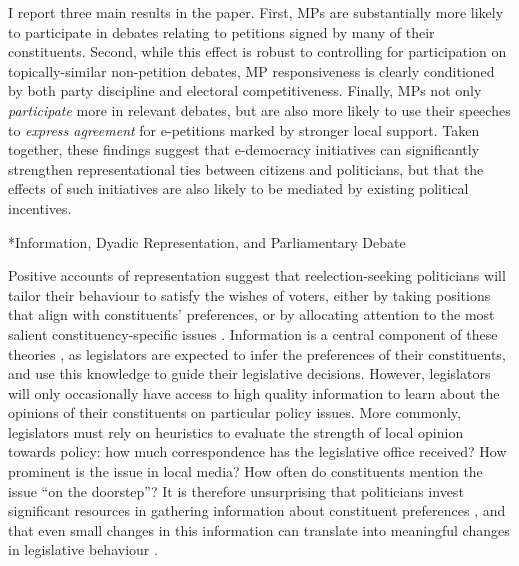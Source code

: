 \documentclass[12pt]{article}
\makeatletter
\renewcommand{\section}{\@startsection{section}{1}{0mm}{-\baselineskip}{0.20\baselineskip}{\centering\normalfont\normalsize\scshape}}
\makeatother
\begin{document}
I report three main results in the paper. First, MPs are substantially more likely to participate in debates relating to petitions signed by many of their constituents. Second, while this effect is robust to controlling for participation on topically-similar non-petition debates, MP responsiveness is clearly conditioned by both party discipline and electoral competitiveness. Finally, MPs not only \emph{participate} more in relevant debates, but are also more likely to use their speeches to \emph{express agreement} for e-petitions marked by stronger local support. Taken together, these findings suggest that e-democracy initiatives can significantly strengthen representational ties between citizens and politicians, but that the effects of such initiatives are also likely to be mediated by existing political incentives.


\section*{Information, Dyadic Representation, and Parliamentary Debate}

Positive accounts of representation suggest that reelection-seeking politicians will tailor their behaviour to satisfy the wishes of voters, either by taking positions that align with constituents' preferences, or by allocating attention to the most salient constituency-specific issues \citep{downs1957economic, mayhew1974congress, cain1984constituency, hall1996participation}.  Information is a central component of these theories \citep[516--520]{mansbridge2003rethinking}, as legislators are expected to infer the preferences of their constituents, and use this knowledge to guide their legislative decisions. However, legislators will only occasionally have access to high quality information to learn about the opinions of their constituents on particular policy issues. More commonly, legislators must rely on heuristics to evaluate the strength of local opinion towards policy: how much correspondence has the legislative office received? How prominent is the issue in local media? How often do constituents mention the issue ``on the doorstep''? It is therefore unsurprising that politicians invest significant resources in gathering information about constituent preferences \citep{maestas2003incentive}, and that even small changes in this information can translate into meaningful changes in legislative behaviour \citep{butler2017party, bergan2015call}.
\end{document}
